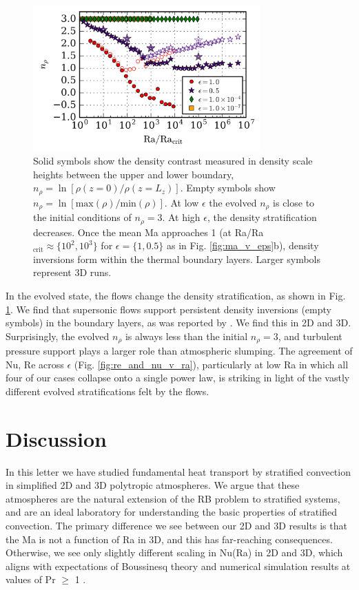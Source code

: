 \documentclass[aps, prl, twocolumn, nofootinbib, groupedaddress, amsfonts, amssymb, amsmath]{revtex4-1}
\begin{document}
\begin{figure}[t]
\includegraphics[width=3.4375in]{./figs/density_v_ra.png}
\caption{\label{fig:nrho_v_ra} 
Solid symbols show the density contrast measured
in density scale heights between the upper and lower boundary, 
$n_\rho = \ln[\rho(z=0)/\rho(z=L_z)]$.
Empty symbols show 
$n_\rho = \ln[\text{max}(\rho)/\text{min}(\rho)]$. 
At low $\epsilon$ the evolved
$n_{\rho}$ is close to the initial conditions of $n_\rho = 3$.  
At high $\epsilon$,
the density stratification decreases.  Once the mean 
Ma approaches 1 (at Ra/Ra$_{\text{crit}} \approx \{10^2, 10^3\}$ for $\epsilon = \{1, 0.5\}$
as in Fig. \ref{fig:ma_v_eps}b), density inversions form within the thermal
boundary layers. Larger symbols represent 3D runs.}
\end{figure}

In the evolved state, the flows change the density stratification,
as shown in Fig. \ref{fig:nrho_v_ra}.
We find that supersonic flows support persistent density inversions (empty symbols)
in the boundary layers, as
was reported by \cite{brandenburg&all2005}.  We find this in 2D and 3D.
Surprisingly, the evolved $n_\rho$ is always less than the initial $n_\rho = 3$,
and turbulent pressure support plays a larger role than atmospheric slumping.
The agreement of Nu, Re across $\epsilon$ (Fig. \ref{fig:re_and_nu_v_ra}), 
particularly at low Ra in which all four of our cases collapse onto a single
power law, is striking in light of the vastly different evolved stratifications
felt by the flows. 

\section{Discussion}
\label{sec:discussion}
In this letter we have studied fundamental heat transport by 
stratified convection in simplified 2D and 3D polytropic atmospheres.
We argue that these atmospheres are the natural extension
of the RB problem to stratified systems, 
and are an ideal laboratory for understanding the basic 
properties of stratified convection. 
The primary difference we see between our 2D and 3D results is that the Ma
is not a function of Ra in 3D, and this has far-reaching consequences.  Otherwise,
we see only slightly different scaling in Nu(Ra) in 2D and 3D, 
which aligns with expectations
of Boussinesq theory and numerical simulation results at 
values of Pr $\geq$ 1 \cite{ahlers&all2009}.  
\end{document}

